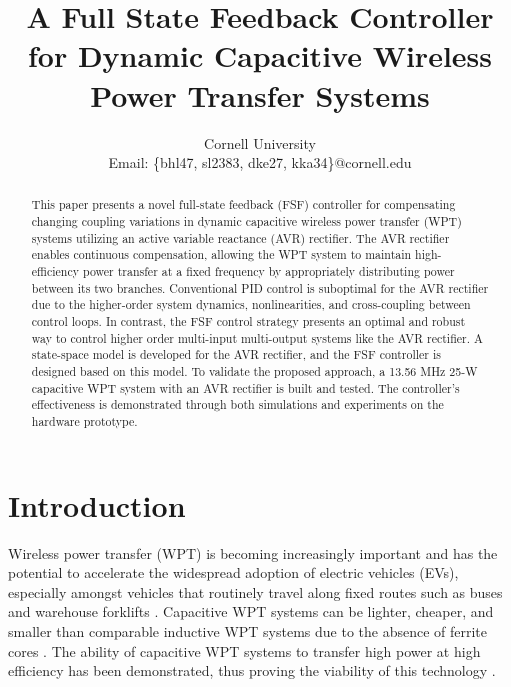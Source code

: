 \documentclass[conference, twocolumn, letterpaper]{IEEEtran}
\title{\singlespacing \fontsize{24}{29} A Full State Feedback Controller for Dynamic Capacitive Wireless Power Transfer Systems}
\author{
    \IEEEauthorblockN{Ben Liao, Sophia Lin, Dheeraj Etta, Khurram K. Afridi}
\IEEEauthorblockA{Department of Electrical and Computer Engineering}
        Cornell University \\
        Email: \{bhl47, sl2383, dke27, kka34\}@cornell.edu
}
\begin{document}
\maketitle

\vspace{-0.85cm}
\begin{abstract}
This paper presents a novel full-state feedback (FSF) controller for compensating changing coupling variations in dynamic capacitive wireless power transfer (WPT) systems utilizing an active variable reactance (AVR) rectifier. The AVR rectifier enables continuous compensation, allowing the WPT system to maintain high-efficiency power transfer at a fixed frequency by appropriately distributing power between its two branches. Conventional PID control is suboptimal for the AVR rectifier due to the higher-order system dynamics, nonlinearities, and cross-coupling between control loops. In contrast, the FSF control strategy presents an optimal and robust way to control higher order multi-input multi-output systems like the AVR rectifier. A state-space model is developed for the AVR rectifier, and the FSF controller is designed based on this model. To validate the proposed approach, a 13.56 MHz 25-W capacitive WPT system with an AVR rectifier is built and tested. The controller’s effectiveness is demonstrated through both simulations and experiments on the hardware prototype.
\end{abstract}

\vspace{0.5cm}

\section{Introduction}

Wireless power transfer (WPT) is becoming increasingly important and has the potential to accelerate the widespread adoption of electric vehicles (EVs), especially amongst vehicles that routinely travel along fixed routes such as buses and warehouse forklifts \cite{2015_Miller_Journal, 2018_Regensburger_COMPEL}. Capacitive WPT systems can be lighter, cheaper, and smaller than comparable inductive WPT systems due to the absence of ferrite cores \cite{2013_Covic_Journal}. The ability of capacitive WPT systems to transfer high power at high efficiency has been demonstrated, thus proving the viability of this technology \cite{2023_Maji_WPTCE}.
\end{document}
